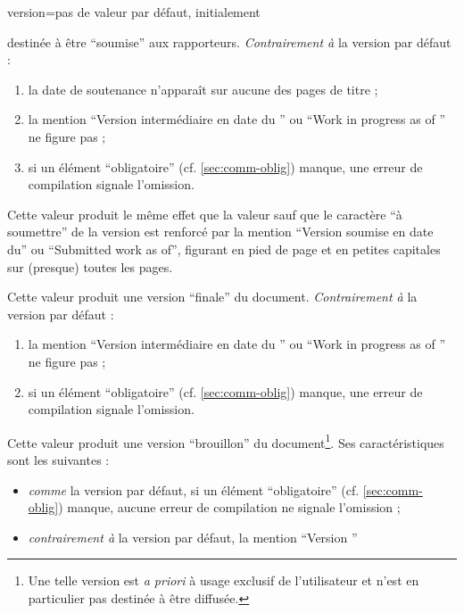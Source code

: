 {\begin{docKey}{version}{=\textbar{}\textbar{}\textbar{}\textbar{}\textbar{}}{pas
      de valeur par défaut, initialement }
\begin{description}
      destinée à être \enquote{soumise} aux rapporteurs. \emph{Contrairement à}
      la version par défaut :
      \begin{enumerate}
      \item la date de soutenance n'apparaît sur aucune des pages de titre ;
      \item la mention \enquote{Version intermédiaire en date du }
        ou \foreignquote{english}{Work in progress as of } ne figure
        pas ;
      \item si un élément \enquote{obligatoire} (cf. \vref{sec:comm-oblig})
        manque, une erreur de compilation signale l'omission.
      \end{enumerate}
    \item[\docValue{submitted*}.] Cette valeur produit le même effet que la
      valeur  sauf que le caractère \enquote{à soumettre}
      de la version est renforcé par la mention \enquote{Version soumise en
        date du} ou \foreignquote{english}{Submitted work as of}\selonlangue{},
      figurant en pied de page et en petites capitales sur (presque) toutes les
      pages.
    \item[\docValue{final}.] Cette valeur produit une version \enquote{finale}
      du document. \emph{Contrairement à} la version par défaut :
      \begin{enumerate}
      \item la mention \enquote{Version intermédiaire en date du }
        ou \foreignquote{english}{Work in progress as of } ne figure
        pas ;
      \item si un élément \enquote{obligatoire} (cf. \vref{sec:comm-oblig})
        manque, une erreur de compilation signale l'omission.
      \end{enumerate}
    \item[\docValue{draft}.] Cette valeur produit une version
      \enquote{brouillon} du document\footnote{Une telle version est \emph{a
          priori} à usage exclusif de l'utilisateur et n'est en particulier pas
        destinée à être diffusée.}. Ses caractéristiques sont les suivantes :
      \begin{itemize}
      \item \emph{comme} la version par défaut, si un élément \enquote{obligatoire}
        (cf. \vref{sec:comm-oblig}) manque, aucune erreur de compilation ne
        signale l'omission ;
      \item \emph{contrairement à} la version par défaut, la mention \enquote{Version
}
\end{itemize}
\end{description}
\end{docKey}}
